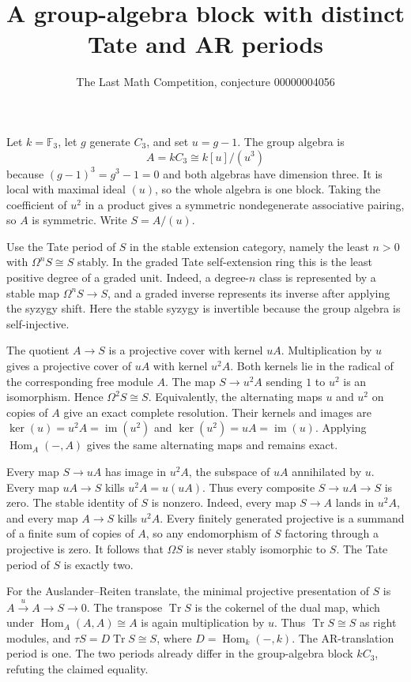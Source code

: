 \documentclass[11pt]{article}
\title{A group-algebra block with distinct Tate and AR periods}
\author{The Last Math Competition, conjecture 00000004056}
\date{}
\begin{document}
\maketitle

Let \(k=\mathbb F_3\), let \(g\) generate \(C_3\), and set \(u=g-1\).
The group algebra is
\[
  A=kC_3\cong k[u]/(u^3)
\]
because \((g-1)^3=g^3-1=0\) and both algebras have dimension three.
It is local with maximal ideal \((u)\), so the whole algebra is one block.
Taking the coefficient of \(u^2\) in a product gives a symmetric
nondegenerate associative pairing, so \(A\) is symmetric. Write \(S=A/(u)\).

Use the Tate period of \(S\) in the stable extension category, namely the
least \(n>0\) with \(\Omega^n S\cong S\) stably. In the graded Tate
self-extension ring this is the least positive degree of a graded unit.
Indeed, a degree-\(n\) class is represented by a stable map
\(\Omega^n S\to S\), and a graded inverse represents its inverse after
applying the syzygy shift. Here the stable syzygy is invertible because
the group algebra is self-injective.

The quotient \(A\to S\) is a projective cover with kernel \(uA\).
Multiplication by \(u\) gives a projective cover of \(uA\) with kernel
\(u^2A\). Both kernels lie in the radical of the corresponding free
module \(A\). The map \(S\to u^2A\) sending \(1\) to \(u^2\) is an
isomorphism. Hence \(\Omega^2 S\cong S\). Equivalently, the alternating
maps \(u\) and \(u^2\) on copies of \(A\) give an exact complete
resolution. Their kernels and images are \(\ker(u)=u^2A=\operatorname{im}(u^2)\)
and \(\ker(u^2)=uA=\operatorname{im}(u)\). Applying
\(\operatorname{Hom}_A(-,A)\) gives the same alternating maps and remains
exact.

Every map \(S\to uA\) has image in \(u^2A\), the subspace of \(uA\)
annihilated by \(u\). Every map \(uA\to S\) kills \(u^2A=u(uA)\).
Thus every composite \(S\to uA\to S\) is zero. The stable identity of
\(S\) is nonzero. Indeed, every map \(S\to A\) lands in \(u^2A\), and
every map \(A\to S\) kills \(u^2A\). Every finitely generated projective
is a summand of a finite sum of copies of \(A\), so any endomorphism of
\(S\) factoring through a projective is zero. It follows that
\(\Omega S\) is never stably isomorphic to \(S\). The Tate period of
\(S\) is exactly two.

For the Auslander--Reiten translate, the minimal projective presentation
of \(S\) is \(A\xrightarrow{u} A\to S\to0\).
The transpose \(\operatorname{Tr} S\) is the cokernel of the dual map,
which under \(\operatorname{Hom}_A(A,A)\cong A\) is again multiplication by
\(u\). Thus \(\operatorname{Tr} S\cong S\) as right modules, and
\(\tau S=D\operatorname{Tr} S\cong S\), where \(D=\operatorname{Hom}_k(-,k)\).
The AR-translation period is one. The two periods already differ in
the group-algebra block \(kC_3\), refuting the claimed equality.
\end{document}
